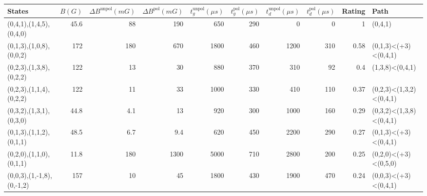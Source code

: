 \begin{tabular}{lrrrrrrrrl}
\hline
 {States}                  &   {$B(G)$} &   {$\Delta B^{\text{unpol}}(mG)$} &   {$\Delta B^{\text{pol}}(mG)$} &   {$t^{\text{unpol}}_{g}(\mu s)$} &   {$t^{\text{pol}}_{g}(\mu s)$} &   {$t^{\text{unpol}}_{d}(\mu s)$} &   {$t^{\text{pol}}_{d}(\mu s)$} &   {Rating} & {Path}                  \\
\hline
 (0,4,1),(1,4,5),(0,4,0)   &       45.6 &                              88   &                           190   &                               650 &                             290 &                                 0 &                               0 &       1    & (0,4,1)                 \\
 (0,1,3),(1,0,8),(0,0,2)   &      172   &                             180   &                           670   &                              1800 &                             460 &                              1200 &                             310 &       0.58 & (0,1,3)<(+3)<(0,4,1)    \\
 (0,2,3),(1,3,8),(0,2,2)   &      122   &                              13   &                            30   &                               880 &                             370 &                               310 &                              92 &       0.4  & (1,3,8)<(0,4,1)         \\
 (0,2,3),(1,1,4),(0,2,2)   &      122   &                              11   &                            33   &                              1000 &                             330 &                               410 &                             110 &       0.37 & (0,2,3)<(1,3,2)<(0,4,1) \\
 (0,3,2),(1,3,1),(0,3,0)   &       44.8 &                               4.1 &                            13   &                               920 &                             300 &                              1000 &                             160 &       0.29 & (0,3,2)<(1,3,8)<(0,4,1) \\
 (0,1,3),(1,1,2),(0,1,1)   &       48.5 &                               6.7 &                             9.4 &                               620 &                             450 &                              2200 &                             290 &       0.27 & (0,1,3)<(+3)<(0,4,1)    \\
 (0,2,0),(1,1,0),(0,1,1)   &       11.8 &                             180   &                          1300   &                              5000 &                             710 &                              2800 &                             200 &       0.25 & (0,2,0)<(+3)<(0,5,0)    \\
 (0,0,3),(1,-1,8),(0,-1,2) &      157   &                              10   &                            45   &                              1800 &                             430 &                              1900 &                             470 &       0.24 & (0,0,3)<(+3)<(0,4,1)    \\
\hline
\end{tabular}